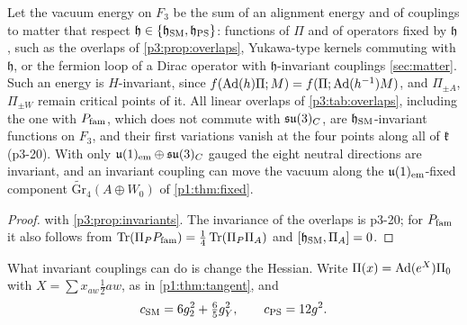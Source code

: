 \begin{corollary}
\label{p3:cor:matter}
Let the vacuum energy on $F_3$ be the sum of an alignment energy and of couplings to matter that respect $\mathfrak h\in\{\mathfrak h_{\rm SM},\mathfrak h_{\rm PS}\}$: functions of $\Pi$
and of operators fixed by $\mathfrak h$, such as the overlaps of \cref{p3:prop:overlaps}, Yukawa-type kernels commuting with $\mathfrak h$, or the fermion loop of a Dirac operator
with $\mathfrak h$-invariant couplings \cref{sec:matter}. Such an energy is $H$-invariant, since $f(\operatorname{Ad}(h)\Pi;M)=f(\Pi;\operatorname{Ad}(h^{-1})M)$, and $\Pi_{\pm A}$, $\Pi_{\pm W}$ remain
critical points of it. All linear overlaps of \cref{p3:tab:overlaps}, including the one with $P_{\rm fam}$, which does not commute with $\mathfrak{su}(3)_C$, are $\mathfrak h_{\rm SM}$-invariant
functions on $F_3$, and their first variations vanish at the four points along all of $\mathfrak k$ (p3-20). With only $\mathfrak{u}(1)_{\rm em}\oplus\mathfrak{su}(3)_C$ gauged the eight neutral
directions are invariant, and an invariant coupling can move the vacuum along the $\mathfrak{u}(1)_{\rm em}$-fixed component $\widetilde{\mathrm{Gr}}_4(A\oplus W_0)$ of
\cref{p1:thm:fixed}.
\end{corollary}

\begin{proof}
 with \cref{p3:prop:invariants}. The invariance of the overlaps is p3-20; for $P_{\rm fam}$ it also follows from $\operatorname{Tr}(\Pi_PP_{\rm fam})=\tfrac14\operatorname{Tr}(\Pi_P\Pi_A)$ and
$[\mathfrak h_{\rm SM},\Pi_A]=0$.
\end{proof}

What invariant couplings can do is change the Hessian. Write $\Pi(x)=\operatorname{Ad}(e^X)\Pi_0$ with $X=\sum x_{aw}\tfrac12aw$, as in \cref{p1:thm:tangent}, and
\[
c_{\rm SM}=6g_2^2+\tfrac65g_Y^2,\qquad c_{\rm PS}=12g^2 .
\]


